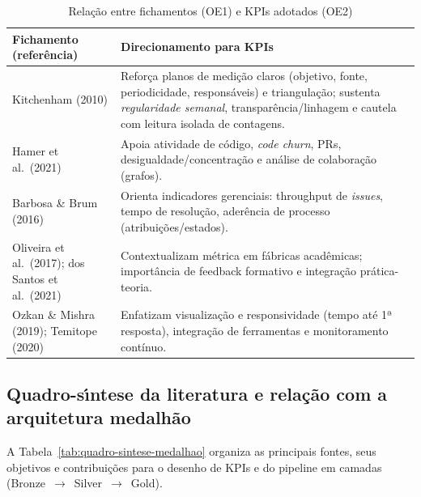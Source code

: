 \documentclass[
	12pt,
	openright,
	oneside,
	a4paper,
	brazil
]{abntex2}
\begin{document}
\begin{table}[h]
\centering
\caption{Relação entre fichamentos (OE1) e KPIs adotados (OE2)}
\label{tab:fichamentos-kpi}
\renewcommand{\arraystretch}{1.15}
\begin{tabular}{p{5cm} p{9cm}}
\toprule
\textbf{Fichamento (referência)} & \textbf{Direcionamento para KPIs} \\
\midrule
Kitchenham (2010) & Reforça planos de medição claros (objetivo, fonte, periodicidade, responsáveis) e triangulação; sustenta \emph{regularidade semanal}, transparência/linhagem e cautela com leitura isolada de contagens. \\
Hamer et al.\ (2021) & Apoia atividade de código, \emph{code churn}, PRs, desigualdade/concentração e análise de colaboração (grafos). \\
Barbosa \& Brum (2016) & Orienta indicadores gerenciais: throughput de \emph{issues}, tempo de resolução, aderência de processo (atribuições/estados). \\
Oliveira et al.\ (2017); dos Santos et al.\ (2021) & Contextualizam métrica em fábricas acadêmicas; importância de feedback formativo e integração prática-teoria. \\
Ozkan \& Mishra (2019); Temitope (2020) & Enfatizam visualização e responsividade (tempo até 1ª resposta), integração de ferramentas e monitoramento contínuo. \\
\bottomrule
\end{tabular}
\end{table}

\subsection{Quadro-s{\'\i}ntese da literatura e rela{\c c}{\~a}o com a arquitetura medalh{\~a}o}
A Tabela~\ref{tab:quadro-sintese-medalhao} organiza as principais fontes, seus objetivos e contribui{\c c}{\~o}es para o desenho de KPIs e do pipeline em camadas (Bronze~$\rightarrow$~Silver~$\rightarrow$~Gold).
\end{document}
